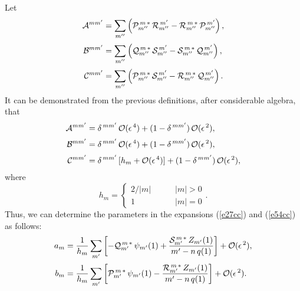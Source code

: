 \documentclass[12pt,prb,aps]{revtex4-1}
\begin{document}
Let
\begin{align}\label{e286a}
{\cal A}^{mm'}&=\sum_{m''}\left({\cal P}_{m''}^{\,m\,\ast}\,{\cal R}_{m''}^{\,m'}- {\cal R}_{m''}^{\,m\,\ast}\,{\cal P}_{m''}^{\,m'}\right),\\[0.5ex]
{\cal B}^{mm'}&=\sum_{m''}\left({\cal Q}_{m''}^{\,m\,\ast}\,{\cal S}_{m''}^{\,m'}- {\cal S}_{m''}^{\,m\,\ast}\,{\cal Q}_{m''}^{\,m'}\right),\\[0.5ex]
{\cal C}^{mm'}&=\sum_{m''}\left({\cal P}_{m''}^{\,m\,\ast}\,{\cal S}_{m''}^{\,m'}- {\cal R}_{m''}^{\,m\,\ast}\,{\cal Q}_{m''}^{\,m'}\right).\label{e288a}
\end{align}
It can be demonstrated  from the previous definitions, after considerable algebra, that\,\cite{am1}
\begin{align}\label{e286}
{\cal A}^{mm'}&= \delta^{\,mm'}\,{\cal O}(\epsilon^{\,4})+ (1-\delta^{\,mm'})\,{\cal O}(\epsilon^{\,2}),\\[0.5ex]
{\cal B}^{mm'}&= \delta^{\,mm'}\,{\cal O}(\epsilon^{\,4})+ (1-\delta^{\,mm'})\,{\cal O}(\epsilon^{\,2}),\\[0.5ex]
{\cal C}^{mm'}&= \delta^{\,mm'}\,[h_m+{\cal O}(\epsilon^{\,4})]+ (1-\delta^{\,mm'})\,{\cal O}(\epsilon^{\,2}),\label{e288}
\end{align}
where 
\begin{equation}
h_m = \left\{\begin{array}{ccc}2/|m|&~~~~~~&\mbox{$|m|>0$}\\[0.5ex]
1&&\mbox{$|m|=0$}\end{array}\right..
\end{equation}
Thus, we can determine the parameters in the expansions (\ref{e27cc}) and (\ref{e54cc}) as follows:
\begin{align}
a_m &= \frac{1}{h_m}\sum_{m'}\left[-{\cal Q}_{m'}^{\,m\,\ast}\,\psi_{m'}(1) + \frac{{\cal S}_{m'}^{\,m\,\ast}\,Z_{m'}(1)}{m'-n\,q(1)}\right]+{\cal O}(\epsilon^{\,2}),\\[0.5ex]
b_m &= \frac{1}{h_m}\sum_{m'}\left[{\cal P}_{m'}^{\,m\,\ast}\,\psi_{m'}(1) -\frac{{\cal R}_{m'}^{\,m\,\ast}\,Z_{m'}(1)}{m'-n\,q(1)}\right]+{\cal O}(\epsilon^{\,2}).\label{e291}
\end{align}
\end{document}
